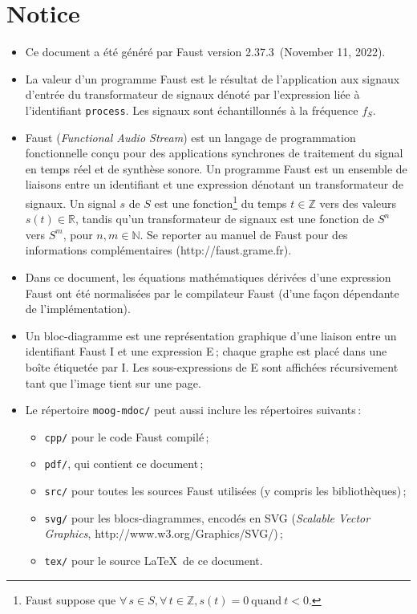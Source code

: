 \documentclass{article}
\newcommand{\faustdocdir}{moog-mdoc}
\newcommand{\faustversion}{2.37.3}
\newcommand{\faustdocdate}{November 11, 2022}
\begin{document}
 \section{Notice} \label{notice}  
\begin{itemize}
	\item Ce document a été généré par Faust version \faustversion\ (\faustdocdate).
	\item La valeur d'un programme Faust est le résultat de l'application aux signaux d'entrée du transformateur de signaux dénoté par l'expression liée à l'identifiant \texttt{process}. Les signaux sont échantillonnés à la fréquence $f_S$.
	\item Faust (\emph{Functional Audio Stream}) est un langage de programmation fonctionnelle conçu pour des applications synchrones de traitement du signal en temps réel et de synthèse sonore. Un programme Faust est un ensemble de liaisons entre un identifiant et une expression dénotant un transformateur de signaux. Un signal $s$ de $S$ est une fonction\footnote{Faust suppose que $\forall \, s \in S, \forall \, t \in \mathbb{Z}, s(t) = 0 \mathrm{\ quand\ } t < 0$.} du temps $t \in \mathbb{Z}$ vers des valeurs $s(t) \in \mathbb{R}$, tandis qu'un transformateur de signaux est une fonction de $S^n$ vers $S^m$, pour $n,m\in \mathbb{N}$. Se reporter au manuel de Faust pour des informations complémentaires (\textsf{http://faust.grame.fr}).
	\item Dans ce document, les équations mathématiques dérivées d'une expression Faust ont été normalisées par le compilateur Faust (d'une façon dépendante de l'implémentation).
	\item Un bloc-diagramme est une représentation graphique d'une liaison entre un identifiant Faust I et une expression E\,; chaque graphe est placé dans une boîte étiquetée par I. Les sous-expressions de E sont affichées récursivement tant que l'image tient sur une page.
	\item Le répertoire \texttt{\faustdocdir/} peut aussi inclure les répertoires suivants\,:
\begin{itemize}
	\item	\texttt{cpp/} pour le code Faust compilé\,; 
	\item	\texttt{pdf/}, qui contient ce document\,; 
	\item	\texttt{src/} pour toutes les sources Faust utilisées (y compris les bibliothèques)\,; 
	\item	\texttt{svg/} pour les blocs-diagrammes, encodés en SVG (\emph{Scalable Vector Graphics}, \textsf{http://www.w3.org/Graphics/SVG/})\,;
	\item	\texttt{tex/} pour le source \LaTeX\ de ce document.
\end{itemize}
\end{itemize}
\end{document}
